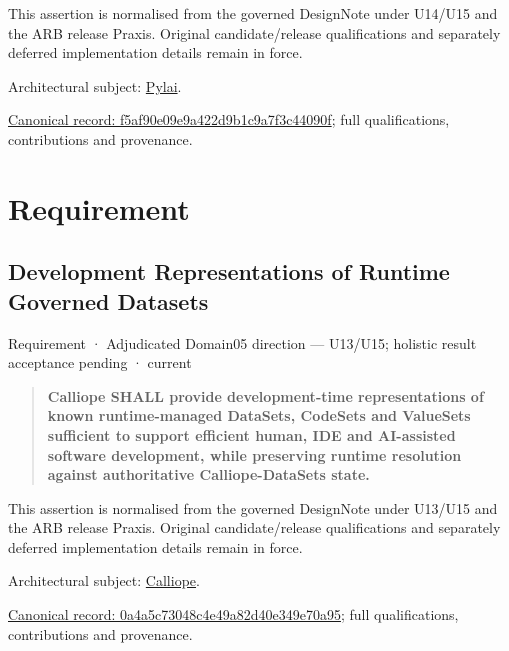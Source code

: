 This assertion is normalised from the governed DesignNote under U14/U15 and the ARB release Praxis. Original candidate/release qualifications and separately deferred implementation details remain in force.



Architectural subject: \hyperref[element:e3e4147fea3640198dc251ed41ee854d]{Pylai}.


{\footnotesize \href{../../../../continuum/motivation/constraint/f5af90e09e9a422d9b1c9a7f3c44090f.md}{Canonical record: f5af90e09e9a422d9b1c9a7f3c44090f}; full qualifications, contributions and provenance.}\par
\section{Requirement}

\subsection{Development Representations of Runtime Governed Datasets}

\label{element:0a4a5c73048c4e49a82d40e349e70a95}
{\small Requirement · Adjudicated Domain05 direction — U13/U15; holistic result acceptance pending · current}\par

\begin{quote}


\textbf{Calliope SHALL provide development-time representations of known
runtime-managed DataSets, CodeSets and ValueSets sufficient to support
efficient human, IDE and AI-assisted software development, while
preserving runtime resolution against authoritative Calliope-DataSets
state.}



\end{quote}


This assertion is normalised from the governed DesignNote under U13/U15 and the ARB release Praxis. Original candidate/release qualifications and separately deferred implementation details remain in force.



Architectural subject: \hyperref[element:466ad8f75a954c0581b5bba090443849]{Calliope}.


{\footnotesize \href{../../../../continuum/motivation/requirement/0a4a5c73048c4e49a82d40e349e70a95.md}{Canonical record: 0a4a5c73048c4e49a82d40e349e70a95}; full qualifications, contributions and provenance.}\par
